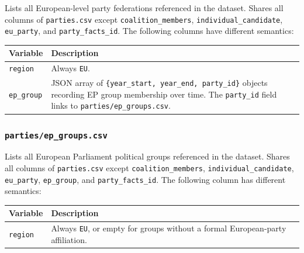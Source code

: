 Lists all European-level party federations referenced in the dataset.
Shares all columns of \texttt{parties.csv} except \texttt{coalition\_members},
\texttt{individual\_candidate}, \texttt{eu\_party}, and \texttt{party\_facts\_id}.
The following columns have different semantics:

\begin{longtable}{p{3cm}p{12cm}}
\toprule
\textbf{Variable} & \textbf{Description} \\
\midrule
\endhead
\texttt{region}    & Always \texttt{EU}. \\
\texttt{ep\_group} & JSON array of \texttt{\{year\_start, year\_end, party\_id\}}
                     objects recording EP group membership over time.
                     The \texttt{party\_id} field links to
                     \texttt{parties/ep\_groups.csv}. \\
\bottomrule
\end{longtable}

\subsubsection{\texttt{parties/ep\_groups.csv}}

Lists all European Parliament political groups referenced in the dataset.
Shares all columns of \texttt{parties.csv} except \texttt{coalition\_members},
\texttt{individual\_candidate}, \texttt{eu\_party}, \texttt{ep\_group},
and \texttt{party\_facts\_id}.
The following column has different semantics:

\begin{longtable}{p{3cm}p{12cm}}
\toprule
\textbf{Variable} & \textbf{Description} \\
\midrule
\endhead
\texttt{region} & Always \texttt{EU}, or empty for groups without a formal
                  European-party affiliation. \\
\bottomrule
\end{longtable}
